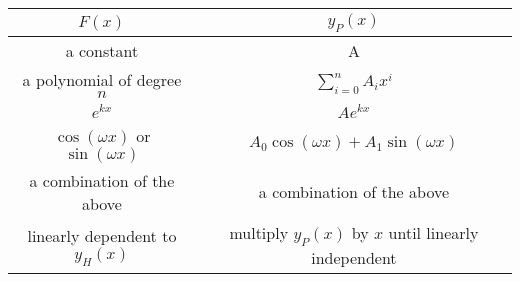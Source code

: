 \documentclass{article}
\begin{document}
\begin{table}[H]
    \centering
    \begin{tabular}{c c}
        \toprule
        \(F\left( x \right)\)                                                  & \(y_P\left( x \right)\)                                                   \\
        \midrule
        a constant                                                             & A                                                                         \\
        a polynomial of degree \(n\)                                           & \(\sum_{i = 0}^n A_i x^i\)                                  \\
        \(e^{kx}\)                                                             & \(A e^{kx}\)                                                              \\
        \(\cos{\left( \omega x \right)}\) or \(\sin{\left( \omega x \right)}\) & \(A_0 \cos{\left( \omega x \right)} + A_1 \sin{\left( \omega x \right)}\) \\
        a combination of the above                                             & a combination of the above                                                \\
        linearly dependent to \(y_H\left( x \right)\)                          & multiply \(y_P\left( x \right)\) by \(x\) until linearly independent      \\
        \bottomrule
    \end{tabular}
\end{table}
\end{document}
